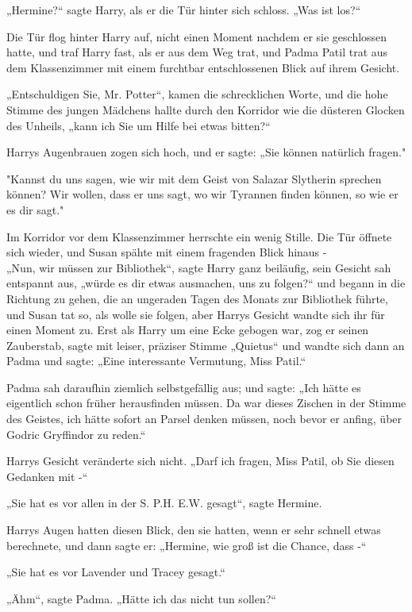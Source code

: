 {„Hermine?“ sagte Harry, als er die Tür hinter sich schloss. „Was ist los?“

Die Tür flog hinter Harry auf, nicht einen Moment nachdem er sie geschlossen hatte, und traf Harry fast, als er aus dem Weg trat, und Padma Patil trat aus dem Klassenzimmer mit einem furchtbar entschlossenen Blick auf ihrem Gesicht.

„Entschuldigen Sie, Mr. Potter“, kamen die schrecklichen Worte, und die hohe Stimme des jungen Mädchens hallte durch den Korridor wie die düsteren Glocken des Unheils, „kann ich Sie um Hilfe bei etwas bitten?“

Harrys Augenbrauen zogen sich hoch, und er sagte: „Sie können natürlich fragen."

"Kannst du uns sagen, wie wir mit dem Geist von Salazar Slytherin sprechen können? Wir wollen, dass er uns sagt, wo wir Tyrannen finden können, so wie er es dir sagt."

Im Korridor vor dem Klassenzimmer herrschte ein wenig Stille. Die Tür öffnete sich wieder, und Susan spähte mit einem fragenden Blick hinaus -\\ „Nun, wir müssen zur Bibliothek“, sagte Harry ganz beiläufig, sein Gesicht sah entspannt aus, „würde es dir etwas ausmachen, uns zu folgen?“ und begann in die Richtung zu gehen, die an ungeraden Tagen des Monats zur Bibliothek führte, und Susan tat so, als wolle sie folgen, aber Harrys Gesicht wandte sich ihr für einen Moment zu. Erst als Harry um eine Ecke gebogen war, zog er seinen Zauberstab, sagte mit leiser, präziser Stimme „Quietus“ und wandte sich dann an Padma und sagte: „Eine interessante Vermutung, Miss Patil.“

Padma sah daraufhin ziemlich selbstgefällig aus; und sagte: „Ich hätte es eigentlich schon früher herausfinden müssen. Da war dieses Zischen in der Stimme des Geistes, ich hätte sofort an Parsel denken müssen, noch bevor er anfing, über Godric Gryffindor zu reden.“

Harrys Gesicht veränderte sich nicht. „Darf ich fragen, Miss Patil, ob Sie diesen Gedanken mit -“

„Sie hat es vor allen in der S. P.H. E.W. gesagt“, sagte Hermine.

Harrys Augen hatten diesen Blick, den sie hatten, wenn er sehr schnell etwas berechnete, und dann sagte er: „Hermine, wie groß ist die Chance, dass -“

„Sie hat es vor Lavender und Tracey gesagt.“

„Ähm“, sagte Padma. „Hätte ich das nicht tun sollen?“

}
